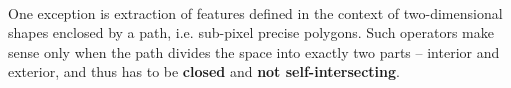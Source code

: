 \paragraph*{}
One exception is extraction of features defined in the context of two-dimensional shapes enclosed by a path, i.e. sub-pixel precise polygons. Such operators make sense only when the path divides the space into exactly two parts -- interior and exterior, and thus has to be \textbf{closed} and \textbf{not self-intersecting}.